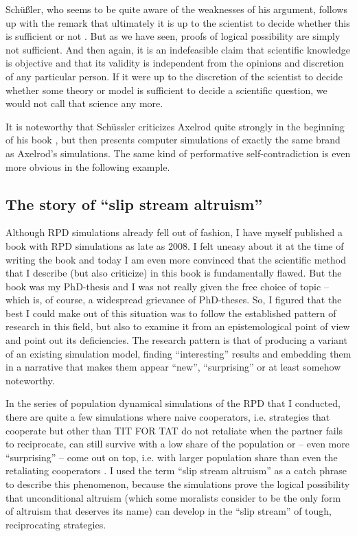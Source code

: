 \documentclass[graybox, English]{svmult}
\begin{document}
Schüßler, who seems to be quite aware of the weaknesses of his argument,
follows up with the remark that ultimately it is up to the scientist
to decide whether this is sufficient or not \citep[91]{schuessler:1990}.
But as we have seen, proofs of logical possibility are simply not
sufficient. And then again, it is an indefeasible claim that
scientific knowledge is objective and that its validity is independent
from the opinions and discretion of any particular person. If it were
up to the discretion of the scientist to decide whether some theory or
model is sufficient to decide a scientific question, we would not call
that science any more. 

It is noteworthy that Schüssler criticizes Axelrod quite strongly in
the beginning of his book \citep[33ff.]{schuessler:1990}, but then
presents computer simulations of exactly the same brand as Axelrod's
simulations. The same kind of performative self-contradiction is even more
obvious in the following example.

\subsection{The story of ``slip stream altruism''}

Although RPD simulations already fell out of fashion, I have myself
published a book with RPD simulations as late as 2008. I felt uneasy
about it at the time of writing the book and today I am even more
convinced that the scientific method that I describe (but also
criticize) in this book is fundamentally flawed. But the book was my
PhD-thesis and I was not really given the free choice of topic --
which is, of course, a widespread grievance of PhD-theses. So, I figured
that the best I could make out of this situation was to follow the
established pattern of research in this field, but also to examine it
from an epistemological point of view and point out its deficiencies.
The research pattern is that of producing a variant of an existing
simulation model, finding ``interesting'' results and embedding them
in a narrative that makes them appear ``new'', ``surprising'' or at
least somehow noteworthy.

In the series of population dynamical simulations of the RPD that I
conducted, there are quite a few simulations where
naive cooperators, i.e. strategies that cooperate but other than TIT
FOR TAT do not retaliate when the partner fails to reciprocate, can
still survive with a low share of the population or -- even more
``surprising'' -- come out on top, i.e. with larger population share
than even the retaliating cooperators \citep[109ff.]{arnold:2008}. I
used the term ``slip stream altruism'' as a catch phrase to describe
this phenomenon, because the simulations prove the logical possibility
that unconditional altruism (which some moralists consider to be the
only form of altruism that deserves its name) can develop in the
``slip stream'' of tough, reciprocating strategies.
\end{document}
